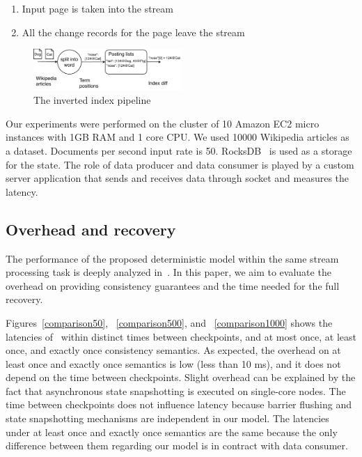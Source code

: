 \begin{enumerate}
    \item Input page is taken into the stream
    \item All the change records for the page leave the stream
\end{enumerate}

\begin{figure}[htbp]
  \centering
  \includegraphics[width=0.50\textwidth]{pics/index}
  \caption{The inverted index pipeline}
  \label {index}
\end{figure}

Our experiments were performed on the cluster of 10 Amazon EC2 micro instances with 1GB RAM and 1 core CPU. We used 10000 Wikipedia articles as a dataset. Documents per second input rate is 50. RocksDB~\cite{rocksdb} is used as a storage for the state. The role of data producer and data consumer is played by a custom server application that sends and receives data through socket and measures the latency.

\subsection{Overhead and recovery}
The performance of the proposed deterministic model within the same stream processing task is deeply analyzed in~\cite{we2018seim}. In this paper, we aim to evaluate the overhead on providing consistency guarantees and the time needed for the full recovery.

Figures~\ref{comparison50}, ~\ref{comparison500}, and ~\ref{comparison1000} shows the latencies of \FlameStream\ within distinct times between checkpoints, and at most once, at least once, and exactly once consistency semantics. As expected, the overhead on at least once and exactly once semantics is low (less than 10 ms), and it does not depend on the time between checkpoints. Slight overhead can be explained by the fact that asynchronous state snapshotting is executed on single-core nodes. The time between checkpoints does not influence latency because barrier flushing and state snapshotting mechanisms are independent in our model. The latencies under at least once and exactly once semantics are the same because the only difference between them regarding our model is in contract with data consumer.

